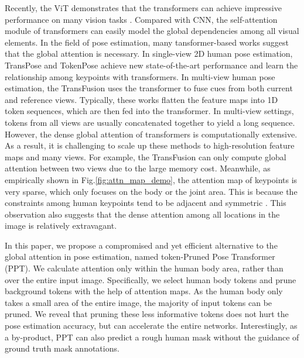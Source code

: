 \documentclass[runningheads]{llncs}
\begin{document}
Recently, the ViT \cite{dosovitskiy2020image} demonstrates that the transformers \cite{vaswani2017attention} can achieve impressive performance on many vision tasks \cite{touvron2020training,carion2020end}. 
Compared with CNN, the self-attention module of transformers can easily model the global dependencies among all visual elements. 
In the field of pose estimation, many tansformer-based works  \cite{li2021tokenpose,yang2020transpose,mao2021tfpose,lin2020end,zheng20213d} suggest that the global attention is necessary. 
In single-view 2D human pose estimation, TransPose \cite{yang2020transpose} and TokenPose \cite{li2021tokenpose} achieve new state-of-the-art performance and learn the relationship among keypoints with transformers. 
In multi-view human pose estimation, the TransFusion \cite{ma2021transfusion} uses the transformer to fuse cues from both current and reference views.
Typically, these works flatten the feature maps into 1D token sequences, which are then fed into the transformer. 
In multi-view settings, tokens from all views are usually concatenated together to yield a long sequence. 
However, the dense global attention of transformers is computationally extensive. 
As a result, it is challenging to scale up these methods to high-resolution feature maps and many views. 
For example, the TransFusion \cite{ma2021transfusion} can only compute global attention between two views due to the large memory cost. 
Meanwhile, as empirically shown in Fig.\ref{fig:attn_map_demo}, the attention map of keypoints is very sparse, which only focuses on the body or the joint area. This is because the constraints among human keypoints tend to be adjacent and symmetric \cite{li2021tokenpose}. 
This observation also suggests that the dense attention among all locations in the image is relatively extravagant. 


In this paper, we propose a compromised and yet efficient alternative to the global attention in pose estimation, named token-Pruned Pose Transformer (PPT). 
We calculate attention only within the human body area, rather than over the entire input image. 
Specifically, we select human body tokens and prune background tokens with the help of attention maps. As the human body only takes a small area of the entire image, the majority of input tokens can be pruned. 
We reveal that pruning these less informative tokens does not hurt the pose estimation accuracy, but can accelerate the entire networks. 
Interestingly, as a by-product, PPT can also predict a rough human mask without the guidance of ground truth mask annotations. 
\end{document}
